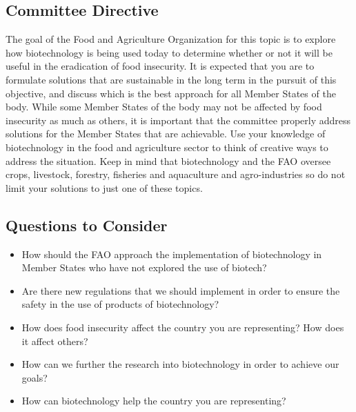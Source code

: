 \documentclass[10pt, letterpaper]{article}
\begin{document}
\subsection{Committee Directive}

The goal of the Food and Agriculture Organization for this topic is to
explore how biotechnology is being used today to determine whether or
not it will be useful in the eradication of food insecurity. It is
expected that you are to formulate solutions that are sustainable in the
long term in the pursuit of this objective, and discuss which is the
best approach for all Member States of the body. While some Member
States of the body may not be affected by food insecurity as much as
others, it is important that the committee properly address solutions
for the Member States that are achievable. Use your knowledge of
biotechnology in the food and agriculture sector to think of creative
ways to address the situation. Keep in mind that biotechnology and the
FAO oversee crops, livestock, forestry, fisheries and aquaculture and
agro-industries so do not limit your solutions to just one of these
topics. \\

\subsection{Questions to Consider}

\begin{itemize}
\item
  
  How should the FAO approach the implementation of biotechnology in
  Member States who have not explored the use of biotech?
  
\item
  
  Are there new regulations that we should implement in order to ensure
  the safety in the use of products of biotechnology?
  
\item
  
  How does food insecurity affect the country you are representing? How
  does it affect others?
  
\item
  
  How can we further the research into biotechnology in order to achieve
  our goals?
  
\item
  
  How can biotechnology help the country you are representing?
  
\end{itemize}
\end{document}
